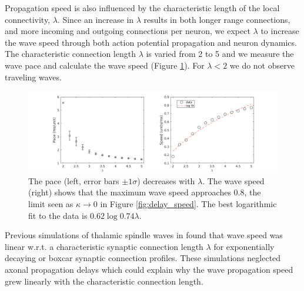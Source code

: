 \documentclass[12pt]{article}
\begin{document}
Propagation speed is also influenced by the characteristic length of the local connectivity, $\lambda$.
Since an increase in $\lambda$ results in both longer range connections, and more incoming and outgoing connections per neuron, we expect $\lambda$ to increase the wave speed through both action potential propagation and neuron dynamics.
The characteristic connection length $\lambda$ is varied from 2 to 5 and we measure the wave pace and calculate the wave speed (Figure \ref{fig:delay_lambda}).
For \color{red}$\lambda<2$\color{black} we do not observe traveling waves.
\begin{figure}[!htb]
 \caption{ The pace (left, error bars $\pm 1 \sigma$) decreases with $\lambda$. 
           The wave speed (right) shows that the maximum wave speed approaches $0.8$, the limit seen as $\kappa \rightarrow 0$ in Figure \ref{fig:delay_speed}. 
           \color{red}The best logarithmic fit to the data is $0.62\log{0.74\lambda}$\color{black}.}
 \label{fig:delay_lambda}
 \centering
   \includegraphics[width=\textwidth]{fig/WaveSpeed_Lambda}
\end{figure}
\color{red}Previous simulations of thalamic spindle waves in \parencite{Golomb1996} found that wave speed was linear w.r.t. a characteristic synaptic connection length $\lambda$ for exponentially decaying or boxcar synaptic connection profiles.
These simulations neglected axonal propagation delays which could explain why the wave propagation speed grew linearly with the characteristic connection length. \color{black}
\end{document}
